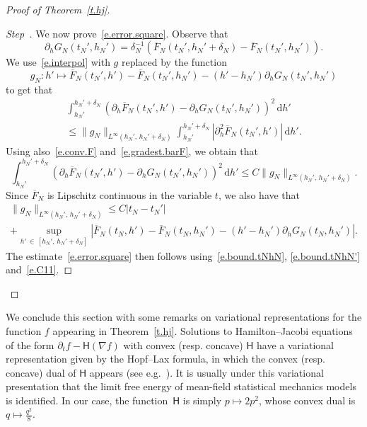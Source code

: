 \documentclass[AHL,Unicode,longabstracts,published]{cedram}
\renewcommand{\d}{\mathrm{d}}
\newcommand{\sfH}{\mathsf{H}}
\newcommand{\1}{\mathds{1}}
\renewcommand{\le}{\leqslant}
\renewcommand{\bar}{\overline}
\newcommand{\de}{\delta}
\newcounter{stepcount}
\newenvironment{step}{\refstepcounter{stepcount}\begin{proof}[Step~\thestepcount]}{\let\qed\relax\end{proof}}
\begin{document}
\begin{proof}[Proof of Theorem~\ref{t.hj}]
\begin{step}\label{prooftheo2.1step6}
We now prove~\eqref{e.error.square}. Observe that
\[
\partial_h G_N\left(t_N',h_N'\right) = \de_N^{-1} \left(\bar F_N\left(t_N',h_N'+ \de_N\right) - \bar F_N\left(t_N',h_N'\right)\right).
\]
We use~\eqref{e.interpol} with $g$ replaced by the function
\[
g_N : h' \mapsto \bar F_N\left(t_N',h'\right) - \bar F_N\left(t_N',h_N'\right) - \left(h'-h_N'\right)\partial_h G_N\left(t_N',h_N'\right)
\]
to get that
\begin{multline*}
\int_{h_N'}^{h_N'+ \de_N} \left(\partial_h \bar F_N\left(t_N',h'\right) - \partial_h G_N\left(t_N',h_N'\right)\right)^2 \, \d h'
\\
\le \|g_N\|_{L^\infty\left(h_N',\,h_N' + \de_N\right)} 
\int_{h_N'}^{h_N' + \de_N} \left|\partial_h^2 \bar F_N\left(t_N',h'\right)\right| \, \d h'.
\end{multline*}
Using also~\eqref{e.conv.F} and~\eqref{e.gradest.barF}, we obtain that
\[
\int_{h_N'}^{h_N'+ \de_N} \left(\partial_h \bar F_N(t_N',h') - \partial_h G_N(t_N',h_N')\right)^2 \, \d h' \le C \|g_N\|_{L^\infty(h_N',\,h_N' + \de_N)}.
\]
Since $\bar F_N$ is Lipschitz continuous in the variable $t$, we also have that
\begin{multline*}
\|g_N\|_{L^\infty\left(h_N',\,h_N' + \de_N\right)} \le C \left|t_N - t_N'\right|
\\
+ \sup_{h'\,\in\,\left[h_N',\,h_N' + \de_N\right]} \left| \bar F_N\left(t_N,h'\right) - \bar F_N\left(t_N,h_N'\right) - \left(h'-h_N'\right)\partial_h G_N\left(t_N,h_N'\right) \right|.
\end{multline*}
The estimate~\eqref{e.error.square} then follows using~\eqref{e.bound.tNhN}, \eqref{e.bound.tNhN'} and~\eqref{e.C11}.\qedhere
\end{step}\let\qed\relax
\end{proof}

We conclude this section with some remarks on variational representations for the function $f$ appearing in Theorem~\ref{t.hj}. Solutions to Hamilton--Jacobi equations of the form $\partial_t f - \sfH(\nabla f)$ with convex (resp. concave) $\sfH$ have a variational representation given by the Hopf--Lax formula, in which the convex (resp. concave) dual of $\sfH$ appears (see e.g.~\cite[Theorem~10.3.4.3]{evans}). It is usually under this variational presentation that the limit free energy of mean-field statistical mechanics models is identified. In our case, the function~$\sfH$ is simply $p \mapsto 2p^2$, whose convex dual is $q \mapsto \tfrac {q^2}{8}$.
\end{document}
